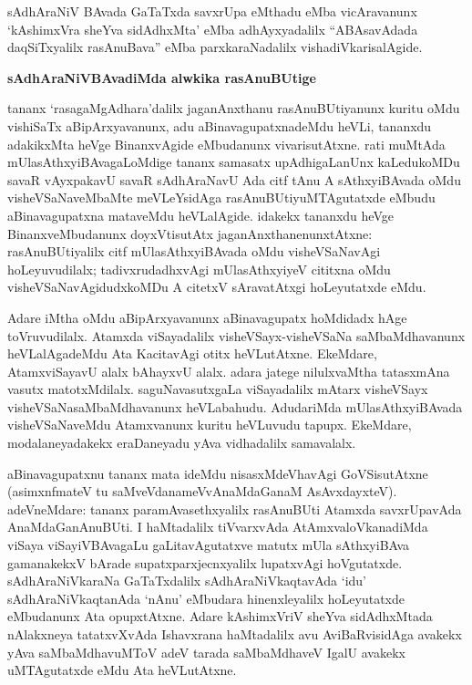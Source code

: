 sAdhAraNiV BAvada GaTaTxda savxrUpa eMthadu eMba vicAravanunx `kAshimxVra sheYva sidAdhxMta' eMba adhAyxyadalilx ``ABAsavAdada daqSiTxyalilx rasAnuBava'' eMba parxkaraNadalilx vishadiVkarisalAgide.

\newpage

\begin{center}
{\Large\bf sAdhAraNiVBAvadiMda alwkika rasAnuBUtige}
\end{center}

tananx `rasagaMgAdhara'dalilx jaganAnxthanu rasAnuBUtiyanunx kuritu oMdu vishiSaTx aBipArxyavanunx, adu aBinavagupatxnadeMdu heVLi, tananxdu adakikxMta heVge Binanx\-vAgide eMbudanunx vivarisutAtxne. rati muMtAda mUlasAthxyiBAvagaLoMdige tananx samasatx upAdhigaLanUnx kaLedukoMDu savaR vAyxpakavU savaR sAdhAraNavU Ada citf tAnu A sAthxyiBAvada oMdu visheVSaNaveMbaMte meVLeYsidAga rasAnuBUtiyuMTAgutatxde eMbudu aBinavagupatxna mataveMdu heVLalAgide. idakekx tananxdu heVge Binanx\-veMbudanunx doyxVtisutAtx jaganAnxthanenunxtAtxne: rasAnuBUtiyalilx citf mUla\-sAthxyiBAvada oMdu visheVSaNavAgi hoLeyuvudilalx; tadivxrudadhxvAgi mUlasAthxyiyeV cititxna oMdu visheVSaNavAgidudxkoMDu A citetxV sAravatAtxgi hoLeyutatxde eMdu.

Adare iMtha oMdu aBipArxyavanunx aBinavagupatx hoMdidadx hAge toVruvu\-dilalx. Atamxda viSayadalilx visheVSayx-visheVSaNa saMbaMdhavanunx heVLalAgadeMdu Ata KacitavAgi otitx heVLutAtxne. EkeMdare, AtamxviSayavU alalx bAhayxvU alalx. adara jatege nilulxvaMtha tatasxmAna vasutx matotxMdilalx. saguNavasutxgaLa viSayadalilx mAtarx visheVSayx visheVSaNasaMbaMdhavanunx heVLabahudu. AdudariMda mUlasAthxyiBAvada visheVSaNaveMdu Atamxvanunx kuritu heVLuvudu tapupx. EkeMdare, modalaneyadakekx eraDaneyadu yAva vidhadalilx samavalalx.

aBinavagupatxnu tananx mata ideMdu nisasxMdeVhavAgi GoVSisutAtxne (asimxnfmateV tu saMveVdanameVvAnaMdaGanaM AsAvxdayxteV). adeVneMdare: tananx paramAvasethxyalilx rasAnuBUti Atamxda savxrUpavAda AnaMdaGanAnuBUti. I haMtadalilx tiVvarxvAda AtAmxvaloVkanadiMda viSaya viSayiVBAvagaLu gaLitavAgutatxve matutx mUla sAthxyiBAva gamanakekxV bArade supatxparxjecnxyalilx lupatxvAgi hoVgutatxde. sAdhAraNiVkaraNa GaTaTxdalilx sAdhAraNiVkaqtavAda `idu' sAdhAraNiVkaqtanAda `nAnu' eMbudara hinenxleyalilx hoLeyutatxde eMbudanunx Ata opupxtAtxne. Adare kAshimxVriV sheYva sidAdhxMtada nAlakxneya tatatxvXvAda Ishavxrana haMtadalilx avu AviBaRvisidAga avakekx yAva saMbaMdhavuMToV adeV tarada saMbaMdhaveV IgalU avakekx uMTAgutatxde eMdu Ata heVLutAtxne.


